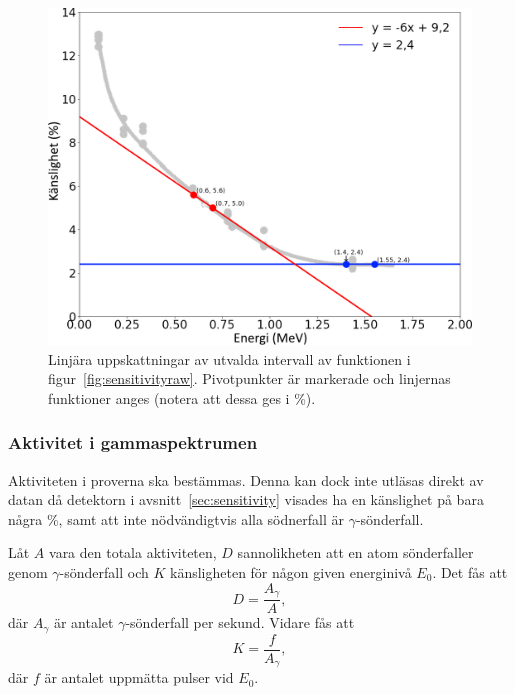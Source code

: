 \begin{figure}[!ht]
    \centering
    \includegraphics[width=\textwidth, keepaspectratio]{../images/sensitivity.png}
    \caption{
        Linjära uppskattningar av utvalda intervall av funktionen i
        figur~\ref{fig:sensitivityraw}. Pivotpunkter är markerade och linjernas
        funktioner anges (notera att dessa ges i \unit{\percent}).
    }
    \label{fig:sensitivity}
\end{figure}

\subsubsection{Aktivitet i gammaspektrumen} \label{sec:activity}

Aktiviteten i proverna ska bestämmas. Denna kan dock inte utläsas direkt av
datan då detektorn i avsnitt~\ref{sec:sensitivity} visades ha en känslighet
på bara några \unit{\percent}, samt att inte nödvändigtvis alla södnerfall är
$\gamma$-sönderfall.

Låt $A$ vara den totala aktiviteten, $D$ sannolikheten att en atom
sönderfaller genom $\gamma$-sönderfall och $K$ känsligheten för någon given
energinivå $E_0$. Det fås att
%
\begin{equation}
    D = \frac{A_\gamma}{A} \label{eq:sharegamma},
\end{equation}
%
där $A_\gamma$ är antalet $\gamma$-sönderfall per sekund. Vidare fås att
%
\begin{equation}
    K = \frac{f}{A_\gamma} \label{eq:sensitivity},
\end{equation}
%
där $f$ är antalet uppmätta pulser vid $E_0$.

